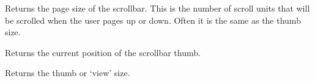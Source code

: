 Returns the page size of the scrollbar. This is the number of scroll units
that will be scrolled when the user pages up or down. Often it is the
same as the thumb size.



\label{wxscrollbargetthumbposition}


Returns the current position of the scrollbar thumb.



\label{wxscrollbargetthumblength}


Returns the thumb or `view' size.



